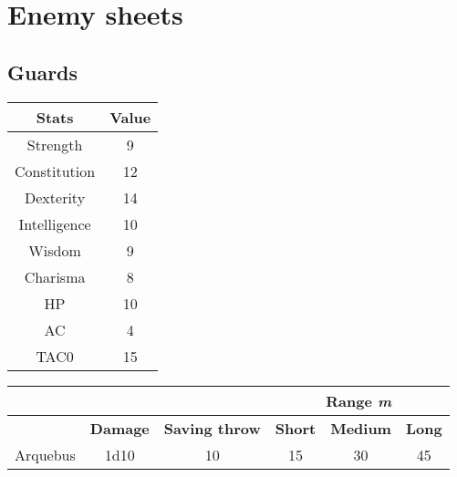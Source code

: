 \section{Enemy sheets}
\subsection{Guards}
\begin{table}[H]
  \centering
\begin{tabular}{|c|c|}
\hline
\rowcolor[HTML]{C0C0C0} 
\textbf{Stats} & \textbf{Value } \\ \hline
Strength & 9  \\ \hline
Constitution & 12  \\ \hline
Dexterity & 14 \\ \hline
Intelligence & 10 \\ \hline
Wisdom & 9 \\ \hline
Charisma & 8\\ \hline
HP & 10 \\ \hline
AC & 4 \\ \hline
TAC0 & 15 \\ \hline
\end{tabular}
\end{table}
\begin{table}[H]
  \centering
  \begin{tabular}{lll|c|c|c|}
    \cline{4-6} & &  & \multicolumn{3}{c|}{\cellcolor[HTML]{C0C0C0}\textbf{Range \textit{m}}} \\ \hline
    \rowcolor[HTML]{C0C0C0} 
    \multicolumn{1}{|l|}{\cellcolor[HTML]{C0C0C0}\textbf{Weapon}} & \textbf{Damage} & \textbf{Saving throw} & \multicolumn{1}{l|}{\cellcolor[HTML]{C0C0C0}\textbf{Short}} & \textbf{Medium} & \textbf{Long} \\ \hline
    \multicolumn{1}{|c|}{Arquebus} & \multicolumn{1}{c|}{1d10} & \multicolumn{1}{c|}{10} & 15 & 30 & 45 \\ \hline
  \end{tabular}
\end{table}

